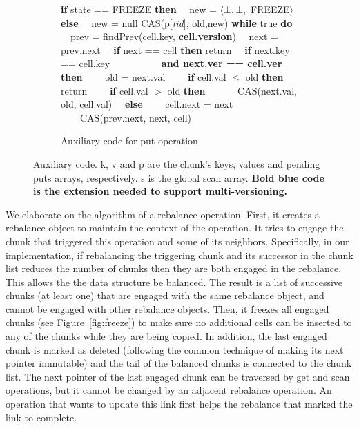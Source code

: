 \begin{figure}[h!]
\begin{center}
\begin{minipage}[b]{0.48\textwidth}
\begin{subfigure}[b]{\textwidth}
\begin{algorithmic}[1]{}
		\State \textbf{if} state == FREEZE \textbf{then}
		\State \ \ new = $\langle \bot, \bot,$ FREEZE$\rangle$
		\State \textbf{else}
		\State \ \ new = null
		\State CAS(p[\textit{tid}], old,new)
		\EndFunction
		\Statex 
		\State \textbf{while} true \textbf{do}
		\State \ \ prev = findPrev(cell.key, \textbf{\color{blue}cell.version})
		\State \ \ next = prev.next
		\State \ \ \textbf{if} next == cell \textbf{then} return 
		\State \ \ \textbf{if} next.key == cell.key 
		\Statex\ \ \ \ \ \ \ \ \ \ \textbf{\color{blue}and next.ver == cell.ver} \textbf{then}
		\State \ \ \ \ old = next.val
		\State \ \ \ \ \textbf{if} cell.val $\leq$ old \textbf{then} return 
		\Statex {}
		\State \ \ \ \ \textbf{if} cell.val $>$ old \textbf{then} 
		\State \ \ \ \ \ \ CAS(next.val, old, cell.val)
		\State \ \ \textbf{else}
		\State \ \ \ \ cell.next = next
		\State \ \ \ \ CAS(prev.next, next, cell)
		\EndFunction
		\end{algorithmic}
		\caption{Auxiliary code for put operation} \label{fig:allocate}\label{fig:insertcell}
	\end{subfigure}
\vfill
\end{minipage}
		\caption{Auxiliary code.  k, v and p are the chunk's keys, values and pending puts arrays, respectively. s is the global scan array. \textbf{\color{blue}Bold blue code is the extension needed to support multi-versioning.}} \label{fig:aux}
	\end{center}
\end{figure}

We elaborate on the algorithm of a rebalance operation. First, it creates a rebalance object to maintain the context of the operation. It tries to engage the chunk that triggered this operation and some of its neighbors. Specifically, in our implementation, if rebalancing the triggering chunk and its successor in the chunk list reduces the number of chunks then they are both engaged in the rebalance. This allows the the data structure be balanced.
The result is a list of successive chunks (at least one) that are engaged with the same rebalance object, and cannot be engaged with other rebalance objects. Then, it freezes all engaged chunks (see Figure~\ref{fig:freeze}) to make sure no additional cells can be inserted to any of the chunks while they are being copied. In addition, the last engaged chunk is marked as deleted (following the common technique of making its next pointer immutable) and the tail of the balanced chunks is connected to the chunk list. The next pointer of the last engaged chunk can be traversed by get and scan operations, but it cannot be changed by an adjacent rebalance operation. An operation that wants to update this link first helps the rebalance that marked the link to complete.  

